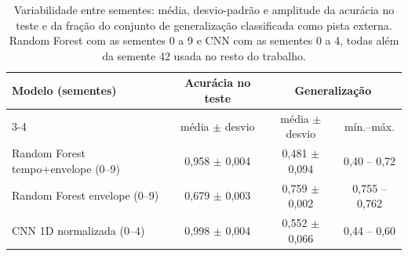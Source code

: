 \begin{table}[htb]
  \centering
  \caption{Variabilidade entre sementes: média, desvio-padrão e amplitude da
  acurácia no teste e da fração do conjunto de generalização classificada como
  pista externa. Random Forest com as sementes 0 a 9 e CNN com as sementes 0 a 4,
  todas além da semente 42 usada no resto do trabalho.}
  \label{tab:sementes}
  \footnotesize
  \begin{tabular}{lccc}
    \toprule
    \textbf{Modelo (sementes)} & \textbf{Acurácia no teste} &
    \multicolumn{2}{c}{\textbf{Generalização}} \\
    \cmidrule(lr){3-4}
    & média $\pm$ desvio & média $\pm$ desvio & mín.--máx. \\
    \midrule
    Random Forest tempo+envelope (0--9) & 0,958 $\pm$ 0,004 & 0,481 $\pm$ 0,094 & 0,40 -- 0,72 \\
    Random Forest envelope (0--9)       & 0,679 $\pm$ 0,003 & 0,759 $\pm$ 0,002 & 0,755 -- 0,762 \\
    CNN 1D normalizada (0--4)            & 0,998 $\pm$ 0,004 & 0,552 $\pm$ 0,066 & 0,44 -- 0,60 \\
    \bottomrule
  \end{tabular}
\end{table}
